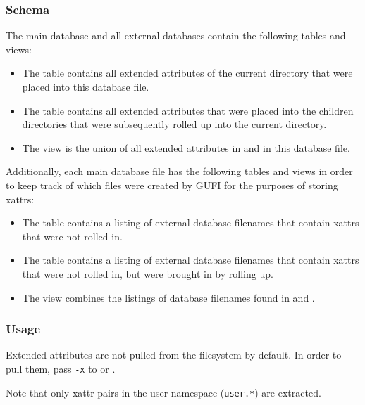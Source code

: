 \subsubsection{Schema}
\label{sec:xattr_schema}
The main database and all external databases contain the following
tables and views:

\begin{itemize}
\item The \xattrspwd table contains all extended attributes of the
  current directory that were placed into this database file.

\item The \xattrsrollup table contains all extended attributes that
  were placed into the children directories that were subsequently
  rolled up into the current directory.

\item The \xattrsavail view is the union of all extended attributes
  in \xattrspwd and \xattrsrollup in this database file.
\end{itemize}

Additionally, each main database file has the following tables and
views in order to keep track of which files were created by GUFI for
the purposes of storing xattrs:

\begin{itemize}
\item The \xattrfilespwd table contains a listing of external database
  filenames that contain xattrs that were not rolled in.
\item The \xattrfilesrollup table contains a listing of external
  database filenames that contain xattrs that were not
  rolled in, but were brought in by rolling up.
\item The \xattrfiles view combines the listings of database filenames
  found in \xattrfilespwd and \xattrfilesrollup.
\end{itemize}

\subsubsection{Usage}
Extended attributes are not pulled from the filesystem by default. In
order to pull them, pass \texttt{-x} to \gufidirindex or
\gufidirtrace.

Note that only xattr pairs in the user namespace (\texttt{user.*}) are
extracted.
